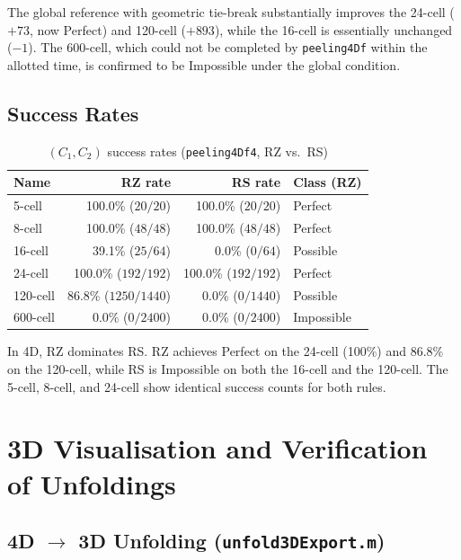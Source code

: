 \documentclass[12pt,a4paper]{article}
\theoremstyle{definition}
\begin{document}
The global reference with geometric tie-break substantially improves
the 24-cell ($+73$, now Perfect) and 120-cell ($+893$),
while the 16-cell is essentially unchanged ($-1$).
The 600-cell, which could not be completed by \texttt{peeling4Df} within
the allotted time, is confirmed to be Impossible under the global
condition.

\subsection{Success Rates}
\label{ssec:successrates}

\begin{table}[h]
\centering
\caption{$(C_1, C_2)$ success rates (\texttt{peeling4Df4}, RZ vs.\ RS)}
\label{tab:successrate}
\begin{tabular}{lrrl}
\toprule
Name & RZ rate & RS rate & Class (RZ) \\
\midrule
5-cell   & 100.0\% ($20/20$)     & 100.0\% ($20/20$)   & Perfect    \\
8-cell   & 100.0\% ($48/48$)     & 100.0\% ($48/48$)   & Perfect    \\
16-cell  &  39.1\% ($25/64$)     &   0.0\% ($0/64$)    & Possible   \\
24-cell  & 100.0\% ($192/192$)   & 100.0\% ($192/192$) & Perfect    \\
120-cell &  86.8\% ($1250/1440$) &   0.0\% ($0/1440$)  & Possible   \\
600-cell &   0.0\% ($0/2400$)    &   0.0\% ($0/2400$)  & Impossible \\
\bottomrule
\end{tabular}
\end{table}

\noindent
In 4D, RZ dominates RS.
RZ achieves Perfect on the 24-cell (100\%) and 86.8\% on the 120-cell,
while RS is Impossible on both the 16-cell and the 120-cell.
The 5-cell, 8-cell, and 24-cell show identical success counts for both rules.


\section{3D Visualisation and Verification of Unfoldings}

\subsection{4D $\to$ 3D Unfolding (\texttt{unfold3DExport.m})}
\end{document}
